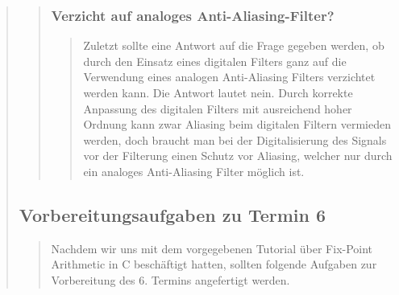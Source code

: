 \begin{quote}
\begin{quote}
\begin{quote}
		  \end{quote}
		  
		  \subsubsection{Verzicht auf analoges Anti-Aliasing-Filter?}
		  \begin{quote}
		  
		  Zuletzt sollte eine Antwort auf die Frage gegeben werden, ob durch den
		  Einsatz eines digitalen Filters ganz auf die Verwendung eines analogen
		  Anti-Aliasing Filters verzichtet werden kann. Die Antwort lautet nein. Durch
		  korrekte Anpassung des digitalen Filters mit ausreichend hoher Ordnung kann zwar 
		  Aliasing beim digitalen Filtern vermieden werden, doch braucht man bei der
		  Digitalisierung des Signals vor der Filterung einen Schutz vor Aliasing,
		  welcher nur durch ein analoges Anti-Aliasing Filter möglich ist.
		  
		  \end{quote}
	
	\end{quote}%
	
	
    \subsection{Vorbereitungsaufgaben zu Termin 6}
    \begin{quote}
    	
    	Nachdem wir uns mit dem vorgegebenen Tutorial über Fix-Point Arithmetic in
    	C beschäftigt hatten, sollten folgende Aufgaben zur Vorbereitung des 6.
    	Termins angefertigt werden.
    	

\end{quote}
\end{quote}
